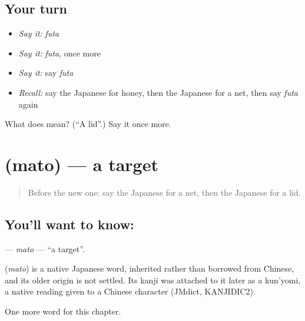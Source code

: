 \subsection*{Your turn}
\begin{itemize}
\raggedright
  \item \emph{Say it:} \emph{futa}
  \item \emph{Say it:} \emph{futa}, once more
  \item \emph{Say it:} say \emph{futa}
  \item \emph{Recall:} say the Japanese for honey, then the Japanese for a net, then say \emph{futa} again
\end{itemize}

\begin{tcolorbox}[breakable,colback=teal!4,colframe=teal!35!black,title={Before you move on}]
What does  mean? (\textquotedblleft{}A lid\textquotedblright{}.) Say it once more.
\end{tcolorbox}
\section[\texorpdfstring{\ja{まと} (mato)}{まと (mato)}]{ (mato) — a target}

\label{lesson:JA-C115-mato}



\begin{quote}
Before the new one: say the Japanese for a net, then the Japanese for a lid.
\end{quote}

\subsection*{You'll want to know: }
\textbf{} — \emph{mato} — \textquotedblleft{}a target\textquotedblright{}.

\begin{cousinweb}
\textbf{} (\emph{mato}) is a native Japanese word, inherited rather than borrowed from Chinese, and its older origin is not settled. Its kanji was attached to it later as a kun'yomi, a native reading given to a Chinese character (JMdict, KANJIDIC2).
\end{cousinweb}

\begin{grammarlens}[title={What you've built}]
One more word for this chapter.
\end{grammarlens}

